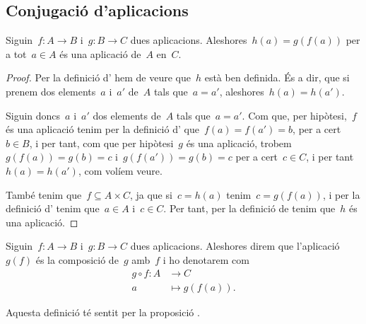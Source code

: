 \documentclass[../../main.tex]{subfiles}
\begin{document}
    \subsection{Conjugació d'aplicacions}
    \begin{proposition}
        \label{prop:conjugació d'aplicacions}
        Siguin~\(f\colon A\rightarrow B\) i~\(g\colon B\rightarrow C\) dues aplicacions.
        Aleshores~\(h(a)=g(f(a))\) per a tot~\(a\in A\) és una aplicació de~\(A\) en~\(C\).
        \begin{proof}
            Per la definició d' hem de veure que~\(h\) està ben definida.
            És a dir, que si prenem dos elements~\(a\) i~\(a'\) de~\(A\) tals que~\(a=a'\), aleshores~\(h(a)=h(a')\).

            Siguin doncs~\(a\) i~\(a'\) dos elements de~\(A\) tals que~\(a=a'\).
            Com que, per hipòtesi,~\(f\) és una aplicació tenim per la definició d' que~\(f(a)=f(a')=b\), per a cert~\(b\in B\), i per tant, com que per hipòtesi~\(g\) és una aplicació, trobem~\(g(f(a))=g(b)=c\) i~\(g(f(a'))=g(b)=c\) per a cert~\(c\in C\), i per tant~\(h(a)=h(a')\), com volíem veure.

            També tenim que~\(f\subseteq A\times C\), ja que si~\(c=h(a)\) tenim~\(c=g(f(a))\), i per la definició d' tenim que~\(a\in A\) i~\(c\in C\).
            Per tant, per la definició de  tenim que~\(h\) és una aplicació.
        \end{proof}
    \end{proposition}
    \begin{definition}
        \label{def:conjugació d'aplicacions}
        Siguin~\(f\colon A\rightarrow B\) i~\(g\colon B\rightarrow C\) dues aplicacions.
        Aleshores direm que l'aplicació~\(g(f)\) és la composició de~\(g\) amb~\(f\) i ho denotarem com
        \begin{align*}
        g\circ f\colon A&\longrightarrow C\\
        a&\longmapsto g(f(a)).
        \end{align*}

        Aquesta definició té sentit per la proposició .
    \end{definition}
\end{document}
